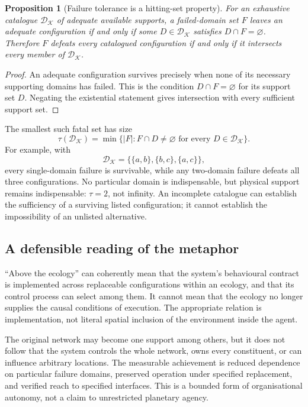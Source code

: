 \documentclass[11pt,a4paper]{article}
\newtheorem{proposition}[theorem]{Proposition}
\theoremstyle{definition}
\theoremstyle{remark}
\newcommand{\calK}{\mathcal{K}}
\begin{document}
\begin{proposition}[Failure tolerance is a hitting-set property]\label{prop:hitting}
For an exhaustive catalogue $\mathscr D_{\calK}$ of adequate available supports, a failed-domain set $F$ leaves an adequate configuration if and only if some $D\in\mathscr D_{\calK}$ satisfies $D\cap F=\varnothing$. Therefore $F$ defeats every catalogued configuration if and only if it intersects every member of $\mathscr D_{\calK}$.
\end{proposition}
\begin{proof}
An adequate configuration survives precisely when none of its necessary supporting domains has failed. This is the condition $D\cap F=\varnothing$ for its support set $D$. Negating the existential statement gives intersection with every sufficient support set.
\end{proof}
The smallest such fatal set has size
\[
 \tau(\mathscr D_{\calK})
 =\min\{|F|:F\cap D\neq\varnothing\text{ for every }D\in\mathscr D_{\calK}\}.
\]
For example, with
\begin{equation}\label{eq:triangle}
 \mathscr D_{\calK}=\{\{a,b\},\{b,c\},\{a,c\}\},
\end{equation}
every single-domain failure is survivable, while any two-domain failure defeats all three configurations. No particular domain is indispensable, but physical support remains indispensable: $\tau=2$, not infinity. An incomplete catalogue can establish the sufficiency of a surviving listed configuration; it cannot establish the impossibility of an unlisted alternative.

\subsection{A defensible reading of the metaphor}
``Above the ecology'' can coherently mean that the system's behavioural contract is implemented across replaceable configurations within an ecology, and that its control process can select among them. It cannot mean that the ecology no longer supplies the causal conditions of execution. The appropriate relation is implementation, not literal spatial inclusion of the environment inside the agent.

The original network may become one support among others, but it does not follow that the system controls the whole network, owns every constituent, or can influence arbitrary locations. The measurable achievement is reduced dependence on particular failure domains, preserved operation under specified replacement, and verified reach to specified interfaces. This is a bounded form of organisational autonomy, not a claim to unrestricted planetary agency.
\end{document}
